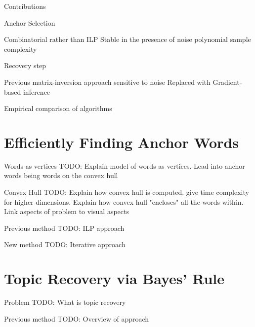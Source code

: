 \documentclass{lecture}
\begin{document}
\begin{plain}{Contributions}
\begin{enumerate}
	\p Anchor Selection
	\begin{itemize}
		\p Combinatorial rather than ILP
		\p Stable in the presence of noise
		\p polynomial sample complexity
	\end{itemize}
	
	\p Recovery step
	\begin{itemize}
		\p Previous matrix-inversion approach sensitive to noise
		\p Replaced with Gradient-based inference
	\end{itemize}
	
	\p Empirical comparison of algorithms
\end{enumerate}
\end{plain}

\section[Anchor Selection]{Efficiently Finding Anchor Words}
\begin{plain}{Words as vertices}
TODO: Explain model of words as vertices. Lead into anchor words being words on the convex hull
\end{plain}

\begin{plain}{Convex Hull}
TODO: Explain how convex hull is computed. give time complexity for higher dimensions. Explain how convex hull "encloses" all the words within. Link aspects of problem to visual aspects
\end{plain}

\begin{plain}{Previous method}
TODO: ILP approach
\end{plain}

\begin{plain}{New method}
TODO: Iterative approach
\end{plain}

\section[Topic Recovery]{Topic Recovery via Bayes' Rule}
\begin{plain}{Problem}
TODO: What is topic recovery
\end{plain}

\begin{plain}{Previous method}
TODO: Overview of approach
\end{plain}
\end{document}
